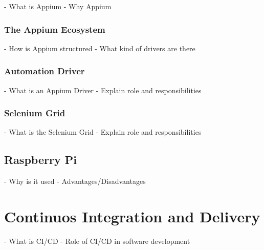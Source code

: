 - What is Appium
- Why Appium

\subsubsection{The Appium Ecosystem\label{sec:ecosystem}}

- How is Appium structured
- What kind of drivers are there

\subsubsection{Automation Driver\label{sec:driver}}

- What is an Appium Driver
- Explain role and responsibilities

\subsubsection{Selenium Grid\label{sec:grid}}

- What is the Selenium Grid
- Explain role and responsibilities

\subsection{Raspberry Pi\label{sec:pi}}

- Why is it used
- Advantages/Disadvantages

\section{Continuos Integration and Delivery\label{sec:cicd}}

- What is CI/CD
- Role of CI/CD in software development
